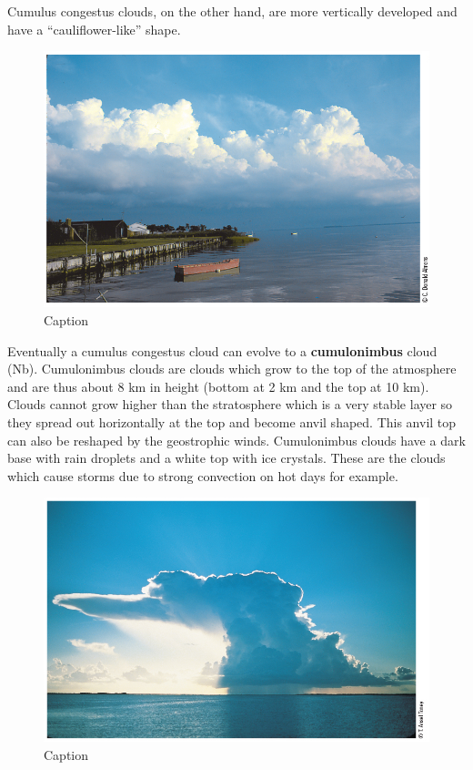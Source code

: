 \documentclass[12pt,oneside]{book}
\begin{document}
Cumulus congestus clouds, on the other hand, are more vertically
developed and have a ``cauliflower-like'' shape.

\begin{figure}

{\centering \includegraphics[width=0.8\linewidth]{figures/Figure255} 

}

\caption{Caption}\label{fig:CLOUD10}
\end{figure}

Eventually a cumulus congestus cloud can evolve to a
\textbf{cumulonimbus} cloud (Nb). Cumulonimbus clouds are clouds which
grow to the top of the atmosphere and are thus about 8 km in height
(bottom at 2 km and the top at 10 km). Clouds cannot grow higher than
the stratosphere which is a very stable layer so they spread out
horizontally at the top and become anvil shaped. This anvil top can also
be reshaped by the geostrophic winds. Cumulonimbus clouds have a dark
base with rain droplets and a white top with ice crystals. These are the
clouds which cause storms due to strong convection on hot days for
example.

\begin{figure}

{\centering \includegraphics[width=0.8\linewidth]{figures/Figure256} 

}

\caption{Caption}\label{fig:CLOUD11}
\end{figure}
\end{document}
